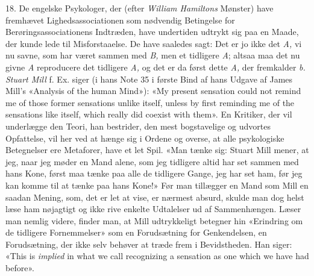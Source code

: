 \documentclass[12pt,a4paper,openany]{book}
\begin{document}
18. De engelske Psykologer, der (efter \emph{William Hamiltons} Mønster) have
fremhævet Lighedsassociationen som nødvendig Betingelse for
Berøringsassociationens Indtræden, have undertiden udtrykt sig paa en Maade,
der kunde lede til Misforstaaelse. De have saaledes sagt: Det er jo ikke det
\textit{A,} vi nu savne, %
som har været sammen med \textit{B,} men et tidligere \textit{A}; altsaa maa
det nu givne \textit{A} reproducere det tidligere \textit{A,} og det er da
først dette \textit{A,} der fremkalder \textit{b. Stuart Mill} f. Ex. siger (i
hans Note 35 i første Bind af hans Udgave af James Mill's «Analysis of the
human Mind»): «My present sensation could not remind me of those former
sensations unlike itself, unless by first reminding me of the sensations like
itself, which really did coexist with them». En Kritiker, der vil underlægge
den Teori, han bestrider, den mest bogstavelige og udvortes Opfattelse, vil her
ved at hænge sig i Ordene og overse, at alle psykologiske Betegnelser ere
Metaforer, have et let Spil. «Man tænke sig: Stuart Mill mener, at jeg, naar
jeg møder en Mand alene, som jeg tidligere altid har set sammen med hans Kone,
først maa tænke paa alle de tidligere Gange, jeg har set ham, før jeg kan komme
til at tænke paa hans Kone!» Før man tillægger en Mand som Mill en saadan
Mening, som, det er let at vise, er nærmest absurd, skulde man dog helst læse
ham nøjagtigt og ikke rive enkelte Udtalelser ud af Sammenhængen. Læser man
nemlig videre, finder man, at Mill udtrykkeligt betegner hin «Erindring om de
tidligere Fornemmelser» som en Forudsætning for Genkendelsen, en Forudsætning,
der ikke selv behøver at træde frem i Bevidstheden. Han siger: «This is
\emph{implied} in what we call recognizing a sensation as one which we have had
before».
\end{document}
